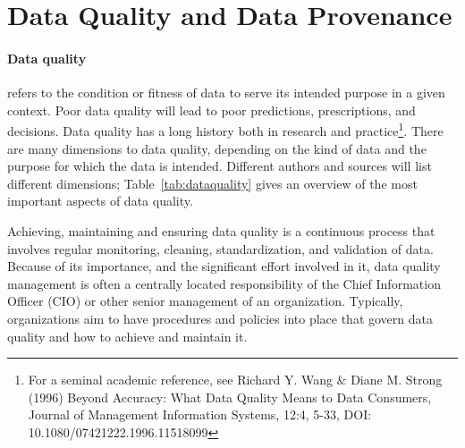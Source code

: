 \section{Data Quality and Data Provenance}

\paragraph*{Data quality} refers to the condition or fitness of data to serve its intended purpose in a given context. Poor data quality will lead to poor predictions, prescriptions, and decisions. Data quality has a long history both in research and practice\footnote{For a seminal academic reference, see Richard Y. Wang \& Diane M. Strong (1996) Beyond Accuracy: What Data Quality Means to Data Consumers, Journal of Management Information Systems, 12:4, 5-33, DOI: 10.1080/07421222.1996.11518099}. There are many dimensions to data quality, depending on the kind of data and the purpose for which the data is intended. Different authors and sources will list different dimensions; Table~\ref{tab:dataquality} gives an overview of the most important aspects of data quality. 

Achieving, maintaining and ensuring data quality is a continuous process that involves regular monitoring, cleaning, standardization, and validation of data. Because of its importance, and the significant effort involved in it, data quality management is often a centrally located responsibility of the Chief Information Officer (CIO) or other senior management of an organization. Typically, organizations aim to have procedures and policies into place that govern data quality and how to achieve and maintain it.  

